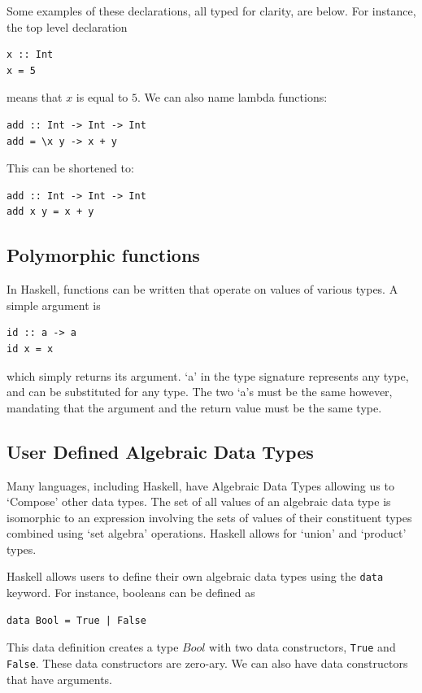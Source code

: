 Some examples of these declarations, all typed for clarity, are below. For instance, the top level declaration
\begin{verbatim}
x :: Int
x = 5
\end{verbatim}
means that $x$ is equal to $5$. We can also name lambda functions:
\begin{verbatim}
add :: Int -> Int -> Int
add = \x y -> x + y
\end{verbatim}
This can be shortened to:
\begin{verbatim}
add :: Int -> Int -> Int
add x y = x + y
\end{verbatim}

\subsection{Polymorphic functions}
In Haskell, functions can be written that operate on values of various types. A simple argument is 

\begin{verbatim}
id :: a -> a
id x = x
\end{verbatim}
\noindent which simply returns its argument. `a' in the type signature represents any type, and can be substituted for any type. The two `a's must be the same however, mandating that the argument and the return value must be the same type.  

\subsection{User Defined Algebraic Data Types}
\label{bg:haskell_udt}
Many languages, including Haskell, have Algebraic Data Types allowing us to `Compose' other data types. The set of all values of an algebraic data type is isomorphic to an expression involving the sets of values of their constituent types combined using `set algebra' operations. Haskell allows for `union' and `product' types.  

Haskell allows users to define their own algebraic data types using the \lstinline[language=SFL]|data| keyword. For instance, booleans can be defined as 

\begin{lstlisting}[language=SFL_unboxed_noprelude_notypes]
data Bool = True | False
\end{lstlisting} 

\noindent This data definition creates a type $Bool$ with two data constructors, \verb|True| and \verb|False|. These data constructors are zero-ary. We can also have data constructors that have arguments. 

